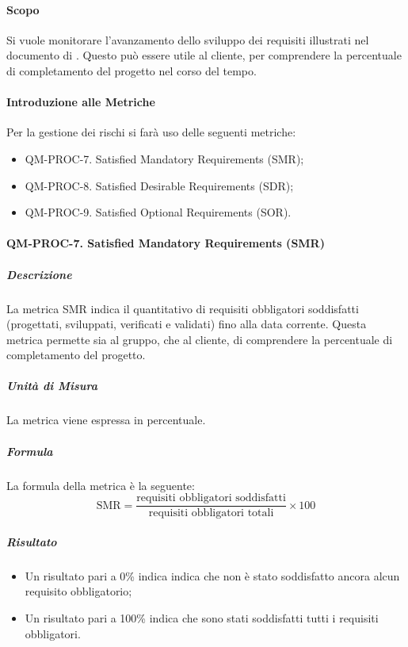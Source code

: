 			\paragraph{Scopo}

			Si vuole monitorare l'avanzamento dello sviluppo dei requisiti illustrati nel documento di . Questo può essere utile al cliente, per comprendere la percentuale di completamento del progetto nel corso del tempo.

			\paragraph{Introduzione alle Metriche}

			Per la gestione dei rischi si farà uso delle seguenti metriche:

			\begin{itemize}
				\item QM-PROC-7. Satisfied Mandatory Requirements (SMR);
				\item QM-PROC-8. Satisfied Desirable Requirements (SDR);
				\item QM-PROC-9. Satisfied Optional Requirements (SOR).
			\end{itemize}

			\paragraph{QM-PROC-7. Satisfied Mandatory Requirements (SMR)}

				\subparagraph{Descrizione}
				La metrica SMR indica il quantitativo di requisiti obbligatori soddisfatti (progettati, sviluppati, verificati e validati) fino alla data corrente. Questa metrica permette sia al gruppo, che al cliente, di comprendere la percentuale di completamento del progetto.

				\subparagraph{Unità di Misura}
				La metrica viene espressa in percentuale.

				\subparagraph{Formula}
				La formula della metrica è la seguente:
				\[
					\text{SMR} = \frac{\text{requisiti obbligatori soddisfatti}}{\text{requisiti obbligatori totali}} \times 100
				\]

				\subparagraph{Risultato}
				\begin{itemize}
					\item Un risultato pari a 0\% indica indica che non è stato soddisfatto ancora alcun requisito obbligatorio;
					\item Un risultato pari a 100\% indica che sono stati soddisfatti tutti i requisiti obbligatori.
				\end{itemize}

